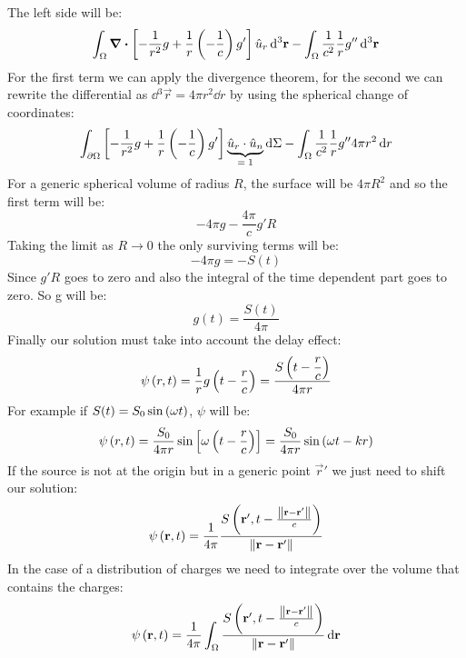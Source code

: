 The left side will be:
\begin{equation}
  \int_{\Omega} \div{\left[-\dfrac{1}{r^2}g + \dfrac{1}{r}\left(- \dfrac{1}{c}\right)g'\right]}\hat{u}_r \dd{^3\vb{r}} - \int_{\Omega}\dfrac{1}{c^2}\dfrac{1}{r}g''\dd{^3\vb{r}}
\end{equation}
For the first term we can apply the divergence theorem, for the second we can rewrite the differential as $\dd{^3\vec{r}} = 4\pi r^2 \dd{r}$ by using the spherical change of coordinates:
\begin{equation}
  \int_{\partial \Omega} \left[-\dfrac{1}{r^2}g + \dfrac{1}{r}\left(- \dfrac{1}{c}\right)g'\right] \underbrace{\hat{u}_r \cdot \hat{u}_n}_{=\;1} \dd{\Sigma} - \int_{\Omega}\dfrac{1}{c^2}\dfrac{1}{r}g''4\pi r^2 \dd{r}
\end{equation}
For a generic spherical volume of radius $R$, the surface will be $4\pi R^2$ and so the first term will be:
\begin{equation}
  -4\pi g - \dfrac{4 \pi}{c}g'R
\end{equation}
Taking the limit as $R \rightarrow 0$ the only surviving terms will be:
\begin{equation}
  -4\pi g = -S(t)
\end{equation}
Since $g'R$ goes to zero and also the integral of the time dependent part goes to zero. So g will be:
\begin{equation}
  g(t) = \dfrac{S(t)}{4\pi}
\end{equation}
Finally our solution must take into account the delay effect:
\begin{equation}
  \psi\left(r,t\right) = \dfrac{1}{r}g\left(t-\dfrac{r}{c}\right)= \dfrac{S\left(t-\dfrac{r}{c}\right)}{4\pi r}
\end{equation}
For example if $S(t) = S_0\sin\left(\omega t\right)$, $\psi$ will be:
\begin{equation}
  \psi\left(r,t\right) = \dfrac{S_0}{4\pi r}\sin \left[\omega\left(t-\dfrac{r}{c}\right)\right] = \dfrac{S_0}{4\pi r}\sin \left(\omega t- kr\right)
\end{equation}
If the source is not at the origin but in a generic point $\vec{r}'$ we just need to shift our solution:
\begin{equation}
  \psi\left(\vb{r},t\right) = \dfrac{1}{4\pi}\dfrac{S\left(\vb{r}', t-\frac{\norm{\vb{r}-\vb{r}'}}{c}\right)}{\norm{\vb{r}-\vb{r}'}}
\end{equation}
In the case of a distribution of charges we need to integrate over the volume that contains the charges:
\begin{equation}
  \psi\left(\vb{r},t\right) = \dfrac{1}{4\pi}\int_{\Omega }\dfrac{S\left(\vb{r}', t-\frac{\norm{\vb{r}-\vb{r}'}}{c}\right)}{ \norm{\vb{r}-\vb{r}'}} \dd{\vb{r}}
\end{equation}

